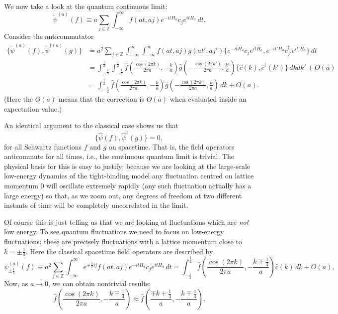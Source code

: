 \documentclass[prl,twocolumn,lengthcheck,superscriptaddress]{revtex4-1}
\theoremstyle{definition}
\theoremstyle{remark}
\begin{document}
We now take a look at the quantum continuous limit:
\begin{equation}
	\widetilde{\psi}^{(a)}(f) \equiv a\sum_{j\in\mathbb{Z}} \int_{-\infty}^\infty f(at, aj) e^{-itH_a}c_j e^{itH_a} \, dt.
\end{equation}
Consider the anticommutator
\begin{equation}
	\begin{split}
		\{\widetilde{\psi}^{(a)}(f), {\widetilde{\psi}^{\dag (a)}}(g)\} &= a^2\sum_{j\in\mathbb{Z}} \int_{-\infty}^\infty \int_{-\infty}^\infty f(at, aj)g(at', aj') \{e^{-itH_a}c_j e^{itH_a},  e^{-it'H_a}c_{j'}^\dag e^{it'H_a}\} \, dt \\
		&= \int_{-\frac12}^{\frac12}\int_{-\frac12}^{\frac12}\widehat{f}\left(\frac{\cos(2\pi k)}{2\pi a}, -\frac{k}{a}\right)\widehat{g}\left(-\frac{\cos(2\pi k')}{2\pi a}, \frac{k'}{a}\right) \{\widehat{c}(k), \widehat{c}^\dag(k') \}\, dkdk' + O(a) \\
		&= \int_{-\frac12}^{\frac12}\widehat{f}\left(\frac{\cos(2\pi k)}{2\pi a}, -\frac{k}{a}\right)\widehat{g}\left(-\frac{\cos(2\pi k)}{2\pi a}, \frac{k}{a}\right) \, dk + O(a).
	\end{split}
\end{equation}
(Here the $O(a)$ means that the correction is $O(a)$ when evaluated inside an expectation value.)


An identical argument to the classical case shows us that
\begin{equation}
	\{\widehat{\psi}(f), \widehat{\psi}^\dag(g)\} = 0,
\end{equation}
for all Schwartz functions $f$ and $g$ on spacetime. That is, the field operators anticommute for all times, i.e., the continuous quantum limit is trivial. The physical basis for this is easy to justify: because we are looking at the large-scale low-energy dynamics of the tight-binding model any fluctuation centred on lattice momentum $0$ will oscillate extremely rapidly (any such fluctuation actually has a large energy) so that, as we zoom out, any degrees of freedom at two different instants of time will be completely uncorrelated in the limit. 

Of course this is just telling us that we are looking at fluctuations which are \emph{not} low energy. To see quantum fluctuations we need to focus on low-energy fluctuations: these are precisely fluctuations with a lattice momentum close to $k=\pm \frac14$. Here the classical spacetime field operators are described by
\begin{equation}
	\psi^{(a)}_{\pm\frac{1}{4}}(f) \equiv a^2\sum_{j\in\mathbb{Z}}\int_{-\infty}^{\infty} e^{\pm\frac{\pi}{2} i j}f(at,aj) e^{-itH_a}c_j e^{itH_a} \, dt = \int_{-\frac12}^{\frac12}\widehat{f}\left(\frac{\cos(2\pi k)}{2\pi a}, -\frac{k\mp \frac14}{a}\right) \widehat{c}(k)\, dk + O(a),
\end{equation}
Now, as $a\rightarrow 0$, we can obtain nontrivial results:
\begin{equation}
	\widehat{f}\left(\frac{\cos(2\pi k)}{2\pi a}, -\frac{k\mp \frac14}{a}\right) \approx \widehat{f}\left(\frac{\mp k+\frac14}{a}, -\frac{k\mp \frac14}{a}\right).
\end{equation}
\end{document}
